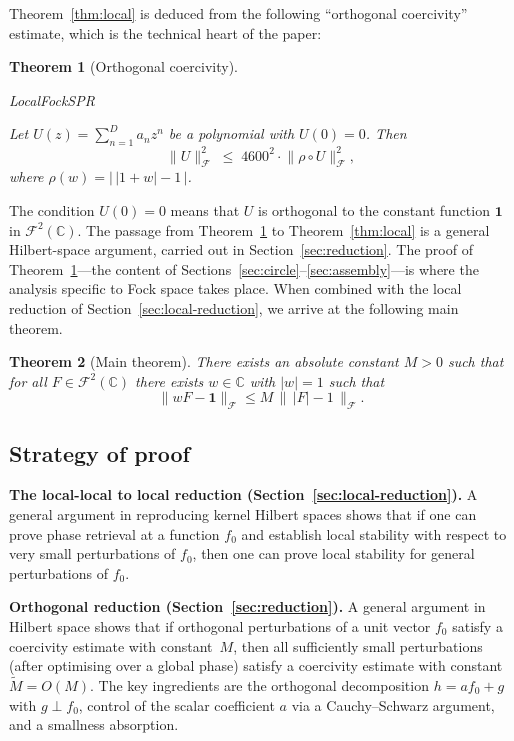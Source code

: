 \documentclass[11pt]{amsart}
\newtheorem{theorem}{Theorem}[section]
\theoremstyle{definition}
\theoremstyle{remark}
\newcommand{\C}{\mathbb{C}}
\newcommand{\abs}[1]{\lvert #1 \rvert}
\newcommand{\norm}[1]{\lVert #1 \rVert}
\newcommand{\rhoFn}{\rho}
\newcommand{\cF}{\mathcal{F}}
\newcommand{\lnbrk}{\penalty100\hskip0pt plus 1pt\relax}
\newcommand{\leanfont}{\normalfont\ttfamily\color{darkblue}}
\newcommand{\leanname}[1]{\par\noindent\begingroup\footnotesize\leanfont
  \def\_{\char`\_\lnbrk}\def\.{\char`\.\lnbrk}#1\endgroup\par\smallskip}
\begin{document}
Theorem~\ref{thm:local} is deduced from the following ``orthogonal
coercivity'' estimate, which is the technical heart of the paper:

\begin{theorem}[Orthogonal coercivity]\label{thm:orthog}
\leanname{LocalFockSPR}
Let $U(z) = \sum_{n=1}^D a_n z^n$ be a polynomial with $U(0) = 0$.  Then
\[
\norm{U}_\cF^2
\;\le\;
4600^2 \cdot
\norm{\rhoFn \circ U}_\cF^2,
\]
where $\rhoFn(w) = \bigl\lvert\, \abs{1+w} - 1 \,\bigr\rvert$.
\end{theorem}

The condition $U(0) = 0$ means that $U$ is orthogonal to the constant
function $\mathbf{1}$ in $\cF^2(\C)$.  The passage from
Theorem~\ref{thm:orthog} to Theorem~\ref{thm:local} is a general
Hilbert-space argument, carried out in Section~\ref{sec:reduction}.  The
proof of Theorem~\ref{thm:orthog}---the content of
Sections~\ref{sec:circle}--\ref{sec:assembly}---is where the analysis
specific to Fock space takes place.  When combined with the local reduction
of Section~\ref{sec:local-reduction}, we arrive at the following main
theorem.

\begin{theorem}[Main theorem]\label{thm:main}
There exists an absolute constant \(M>0\) such that for all
\(F\in\cF^2(\C)\) there exists \(w\in\C\) with \(\abs w=1\) such that
\[
\norm{wF-\mathbf 1}_{\cF}
\le
M\,\bigl\|\,\abs F-1\,\bigr\|_{\cF}.
\]
\end{theorem}

\subsection{Strategy of proof}\label{sec:strategy}

\noindent
\textbf{The local-local to local reduction
(Section~\ref{sec:local-reduction}).}\;
A general argument in reproducing kernel Hilbert spaces shows that if one
can prove phase retrieval at a function \(f_0\) and establish local stability
with respect to very small perturbations of \(f_0\), then one can prove local
stability for general perturbations of \(f_0\).

\medskip
\noindent
\textbf{Orthogonal reduction (Section~\ref{sec:reduction}).}\;
A general argument in Hilbert space shows that if orthogonal perturbations
of a unit vector $f_0$ satisfy a coercivity estimate with constant~$M$,
then all sufficiently small perturbations (after optimising over a global
phase) satisfy a coercivity estimate with constant $\widetilde{M} = O(M)$.
The key ingredients are the orthogonal decomposition $h = af_0 + g$ with
$g \perp f_0$, control of the scalar coefficient $a$ via a Cauchy--Schwarz
argument, and a smallness absorption.
\end{document}
